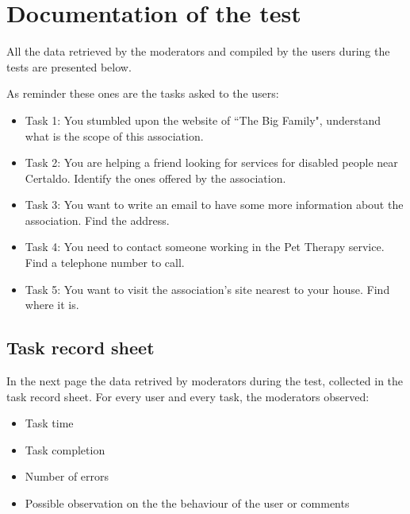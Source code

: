 \section{Documentation of the test}
All the data retrieved by the moderators and compiled by the users during the tests are presented below.

As reminder these ones are the tasks asked to the users:
\begin{itemize}
\item Task 1: You stumbled upon the website of “The Big Family", understand what is the scope of this association.
\item Task 2: You are helping a friend looking for services for disabled people near Certaldo. Identify the ones offered by the association.
\item Task 3: You want to write an email to have some more information about the association. Find the address.
\item Task 4: You need to contact someone working in the Pet Therapy service. Find a telephone number to call.
\item Task 5: You want to visit the association’s site nearest to your house. Find where it is.
\end{itemize}

\subsection{Task record sheet}
In the next page the data retrived by moderators during the test, collected in the task record sheet. For every user and every task, the moderators observed:
\begin{itemize}
\item Task time
\item Task completion
\item Number of errors
\item Possible observation on the the behaviour of the user or comments
\end{itemize}

